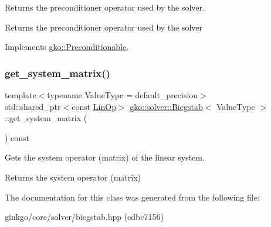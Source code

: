 Returns the preconditioner operator used by the solver. 

\begin{DoxyReturn}{Returns}
the preconditioner operator used by the solver 
\end{DoxyReturn}


Implements \hyperlink{classgko_1_1Preconditionable_ad9545089aef0dfc83bc7a74e5bf1d748}{gko\+::\+Preconditionable}.

\mbox{\label{classgko_1_1solver_1_1Bicgstab_ada73e8ca3e8924011c8780cab92f651e}} 
\subsubsection{\texorpdfstring{get\+\_\+system\+\_\+matrix()}{get\_system\_matrix()}}
{\footnotesize\ttfamily template$<$typename Value\+Type  = default\+\_\+precision$>$ \\
std\+::shared\+\_\+ptr$<$const \hyperlink{classgko_1_1LinOp}{Lin\+Op}$>$ \hyperlink{classgko_1_1solver_1_1Bicgstab}{gko\+::solver\+::\+Bicgstab}$<$ Value\+Type $>$\+::get\+\_\+system\+\_\+matrix (\begin{DoxyParamCaption}{ }\end{DoxyParamCaption}) const\hspace{0.3cm}{\ttfamily [inline]}}



Gets the system operator (matrix) of the linear system. 

\begin{DoxyReturn}{Returns}
the system operator (matrix) 
\end{DoxyReturn}


The documentation for this class was generated from the following file\+:\begin{DoxyCompactItemize}
\item 
ginkgo/core/solver/bicgstab.\+hpp (edbc7156)\end{DoxyCompactItemize}

